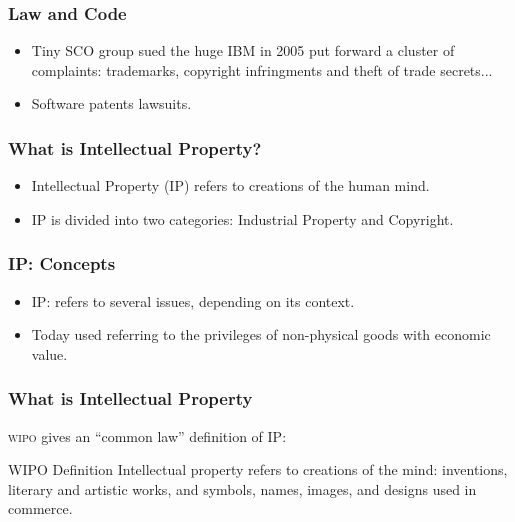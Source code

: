 

\begin{frame}
\frametitle{Law and Code}

\begin{itemize}
\item Tiny SCO group sued the huge IBM in 2005 put forward a cluster of complaints: trademarks, copyright infringments and theft of trade secrets...
\item Software patents lawsuits. 
\end{itemize}

\end{frame}





\begin{frame}
\frametitle{What is Intellectual Property?}

\begin{itemize}
\item Intellectual Property (IP) refers to creations of the human mind.
\item IP is divided into two categories: Industrial Property and Copyright.  
\end{itemize}

\end{frame}


\begin{frame}
\frametitle{IP: Concepts}

\begin{itemize}
\item IP: refers to several issues, depending on its context.
\item Today used referring to the privileges of non-physical goods with economic value.
\end{itemize}

\end{frame}



\begin{frame}
\frametitle{What is Intellectual Property}

\textsc{wipo} gives an ``common law'' definition of IP:

\begin{block}{WIPO Definition}
  Intellectual property refers to creations of the mind:
  inventions, literary and artistic works, and symbols, names, images,
  and designs used in commerce.
\end{block}

\end{frame}



